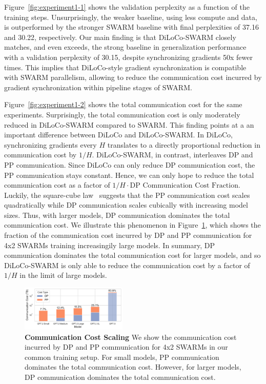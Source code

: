 \documentclass{article}
\begin{document}
Figure~\ref{fig:experiment1-1} shows the validation perplexity as a function of
the training steps. Unsurprisingly, the weaker baseline, using less compute and
data, is outperformed by the stronger SWARM baseline with final perplexities of 
37.16 and 30.22, respectively. Our main finding is that DiLoCo-SWARM closely
matches, and even exceeds, the strong baseline in generalization performance
with a validation perplexity of 30.15, despite synchronizing gradients 50x fewer
times. This implies that DiLoCo-style gradient synchronization is compatible
with SWARM parallelism, allowing to reduce the communication cost incurred by 
gradient synchronization within pipeline stages of SWARM.

Figure~\ref{fig:experiment1-2} shows the total communication cost for the same
experiments. Surprisingly, the total communication cost is only moderately
reduced in DiLoCo-SWARM compared to SWARM. This finding points at a an important
difference between DiLoCo and DiLoCo-SWARM. In DiLoCo, synchronizing gradients
every $H$ translates to a directly proportional reduction in communication cost
by $1/H$. DiLoCo-SWARM, in contrast, interleaves DP and PP communication. Since
DiLoCo can only reduce DP communication cost, the PP communication stays
constant.  Hence, we can only hope to reduce the total communication cost as a
factor of $1/H \cdot \text{DP Communication Cost Fraction}$. Luckily, the
square-cube law~\cite{ryabinin2023swarm} suggests that the PP communication cost
scales quadratically while DP communication scales cubically with increasing
model sizes. Thus, with larger models, DP communication dominates the total
communication cost. We illustrate this phenomenon in
Figure~\ref{fig:square-cube-law}, which shows the fraction of the communication
cost incurred by DP and PP communication for 4x2 SWARMs training increasingily
large models. In summary, DP communication dominates the total communication
cost for larger models, and so DiLoCo-SWARM is only able to reduce the
communication cost by a factor of $1/H$ in the limit of large models.

\begin{figure}[ht]
  \centering
  \includegraphics[width=0.45\textwidth]{figures/square-cube-law.pdf}
  \caption{\textbf{Communication Cost Scaling} We show the communication cost
  incurred by DP and PP communication for 4x2 SWARMs in our common training
  setup.  For small models, PP communication dominates the total communication
  cost. However, for larger models, DP communication dominates the total
  communication cost.} 
  \label{fig:square-cube-law}
\end{figure}
\end{document}
